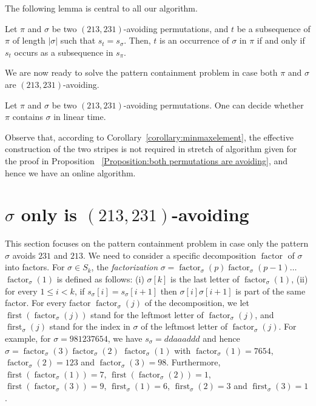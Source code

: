 \documentclass[a4paper]{llncs}
\newcommand{\pmotif}{\sigma}
\DeclareMathOperator{\firstia}{first}
\newcommand{\firsti}[2]{\firstia_{{#1}}({#2})}
\DeclareMathOperator{\factora}{factor}
\newcommand{\factor}[2]{\factora_{{#1}}({#2})}
\DeclareMathOperator{\firsta}{first}
\newcommand{\first}[2]{\firsta(\factor{#1}{#2})}
\begin{document}
The following lemma is central to all our algorithm.

\begin{lemma}
\label{lemma:MatchStripeToPermutation}
Let $\pi$ and $\sigma$ be two $(213,231)$-avoiding permutations,
and $t$ be a subsequence of $\pi$ of length $|\sigma|$ such that $s_t = s_\sigma$.
Then, $t$ is an occurrence of $\sigma$ in $\pi$ if and only if
$s_t$ occurs as a subsequence in $s_\pi$.
\end{lemma}

We are now ready to solve the pattern containment problem in case
both $\pi$ and $\sigma$ are $(213, 231)$-avoiding.

\begin{proposition}
	\label{Proposition:both permutations are avoiding}
	Let $\pi$ and $\sigma$ be two $(213,231)$-avoiding permutations.
	One can decide whether $\pi$ contains $\sigma$ in linear time.
\end{proposition}

Observe that, according to Corollary~\ref{corollary:minmaxelement},
the effective construction of the two stripes is not required in stretch 
of algorithm given for the proof in 
Proposition~
\ref{Proposition:both permutations are avoiding},
and hence we have an online algorithm.


\section{$\sigma$ only is $(213,231)$-avoiding}
\label{section:sigma only avoid 231 and 213}

This section focuses on the pattern containment problem
in case only the pattern $\sigma$ avoids $231$ and $213$.
We need to consider a specific decomposition $\factora$ of $\sigma$ into factors.
For $\sigma \in S_k$, the \emph{factorization}
$\sigma = \factor{\pmotif}{p} \factor{\pmotif}{p-1} \ldots$ $\factor{\pmotif}{1}$
is defined as follows:
(i) $\sigma[k]$ is the last letter of $\factor{\pmotif}{1}$,
(ii) for every $1 \leq i < k$,
if $s_\sigma[i] = s_\sigma[i+1]$ then
$\sigma[i]\sigma[i+1]$ is part of the same factor.
For every factor $\factor{\pmotif}{j}$ of the decomposition, we let
$\first{\pmotif}{j}$ stand for the leftmost letter of $\factor{\pmotif}{j}$,
and $\firsti{\pmotif}{j}$ stand for the index in $\sigma$
of the leftmost letter of $\factor{\pmotif}{j}$.
For example,
for $\sigma = 981237654$,
we have
$s_\sigma = ddaaaddd$ and hence
$\sigma = \factor{\pmotif}{3} \factor{\pmotif}{2}$ $ \factor{\pmotif}{1}$ with
$\factor{\pmotif}{1} =7654$, $\factor{\pmotif}{2} = 123$ and $\factor{\pmotif}{3} = 98$.
Furthermore,
$\first{\pmotif}{1} = 7$, $\first{\pmotif}{2} = 1$, $\first{\pmotif}{3} = 9$,
$\firsti{\pmotif}{1} = 6$, $\firsti{\pmotif}{2} = 3$ and $\firsti{\pmotif}{3} = 1$.
\end{document}
